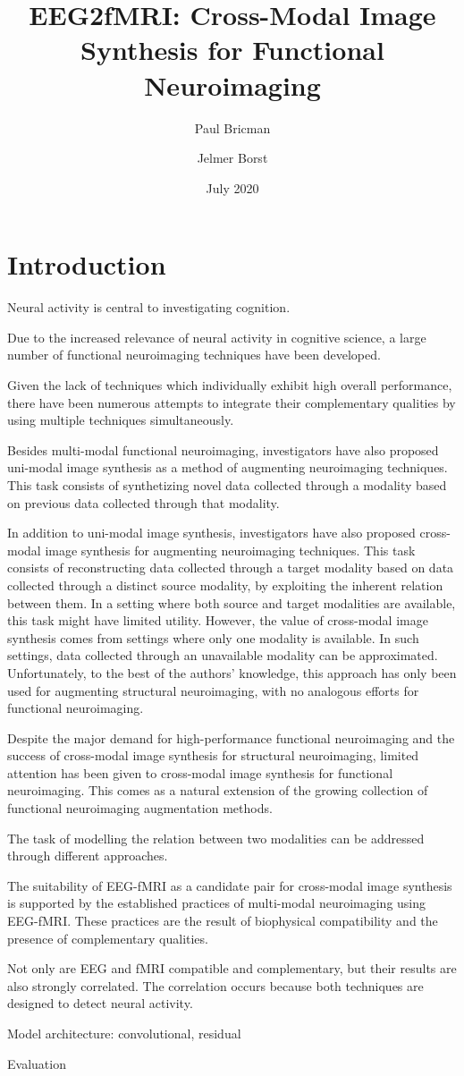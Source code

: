 \documentclass{article}
\title{EEG2fMRI: Cross-Modal Image Synthesis for Functional Neuroimaging}
\author{Paul Bricman}
\author{Jelmer Borst}
\affil{University of Groningen}
\date{July 2020}
\begin{document}
\maketitle

\section{Introduction}

Neural activity is central to investigating cognition.

Due to the increased relevance of neural activity in cognitive science, a large number of functional neuroimaging techniques have been developed.

Given the lack of techniques which individually exhibit high overall performance, there have been numerous attempts to integrate their complementary qualities by using multiple techniques simultaneously.

Besides multi-modal functional neuroimaging, investigators have also proposed uni-modal image synthesis as a method of augmenting neuroimaging techniques. This task consists of synthetizing novel data collected through a modality based on previous data collected through that modality.

In addition to uni-modal image synthesis, investigators have also proposed cross-modal image synthesis for augmenting neuroimaging techniques. This task consists of reconstructing data collected through a target modality based on data collected through a distinct source modality, by exploiting the inherent relation between them. In a setting where both source and target modalities are available, this task might have limited utility. However, the value of cross-modal image synthesis comes from settings where only one modality is available. In such settings, data collected through an unavailable modality can be approximated. Unfortunately, to the best of the authors' knowledge, this approach has only been used for augmenting structural neuroimaging, with no analogous efforts for functional neuroimaging.

Despite the major demand for high-performance functional neuroimaging and the success of cross-modal image synthesis for structural neuroimaging, limited attention has been given to cross-modal image synthesis for functional neuroimaging. This comes as a natural extension of the growing collection of functional neuroimaging augmentation methods.

The task of modelling the relation between two modalities can be addressed through different approaches.

The suitability of EEG-fMRI as a candidate pair for cross-modal image synthesis is supported by the established practices of multi-modal neuroimaging using EEG-fMRI. These practices are the result of biophysical compatibility and the presence of complementary qualities. 

Not only are EEG and fMRI compatible and complementary, but their results are also strongly correlated. The correlation occurs because both techniques are designed to detect neural activity.

Model architecture: convolutional, residual

Evaluation
\end{document}
